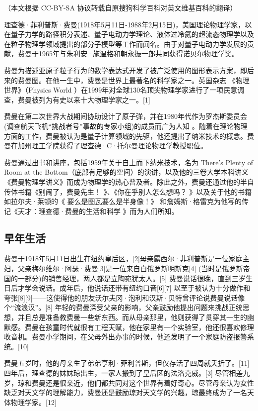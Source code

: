 
（本文根据 CC-BY-SA 协议转载自原搜狗科学百科对英文维基百科的翻译）

理查德·菲利普斯·费曼(1918年5月11日-1988年2月15日)，美国理论物理学家，以在量子力学的路径积分表述、量子电动力学理论、液体过冷氦的超流态物理学以及在粒子物理学领域提出的部分子模型等工作而闻名。由于对量子电动力学发展的贡献，费曼于1965年与朱利安·施温格和朝永振一郎共同获得诺贝尔物理学奖。

费曼为描述亚原子粒子行为的数学表达式开发了被广泛使用的图形表示方案，即后来的费曼图。在他一生中，费曼是世界上最著名的科学家之一。英国杂志 《物理世界》（Physics World ）在1999年对全球130名顶尖物理学家进行了一项民意调查，费曼被列为有史以来十大物理学家之一。[1]

费曼在第二次世界大战期间协助设计了原子弹，并在1980年代作为罗杰斯委员会(调查航天飞机“挑战者号”事故的专家小组)的成员而广为人知 。随着在理论物理方面的工作，费曼被认为是量子计算领域的先驱，他还提出了纳米技术的概念。费曼在加州理工学院获得了理查德·C·托尔曼理论物理学教授职位。

费曼通过出书和讲座，包括1959年关于自上而下纳米技术，名为 There's Plenty of Room at the Bottom（底部有足够的空间）的演讲，以及他的三卷大学本科讲义《费曼物理学讲义》而成为物理学的热心普及者。除此之外，费曼还通过他的半自传体书籍《别闹了，费曼先生！ 》、《你在乎别人怎么想吗？ 》以及关于他的书籍如拉尔夫·莱顿的《 要么是图瓦要么是半身像！》 和詹姆斯·格雷克为他写的传记《天才：理查德·费曼的生活和科学 》而为人们所知。

\subsection{早年生活}
费曼于1918年5月11日出生在纽约皇后区，[2]母亲露西尔·菲利普斯是一位家庭主妇，父亲梅尔维尔·阿瑟·费曼[3]是一位来自白俄罗斯明斯克[4] (当时是俄罗斯帝国的一部分)的销售经理，两人都是立陶宛犹太人。[5] 费曼说话很晚，直到三岁生日后才学会说话。成年后，他说话还带有纽约口音[6][7] 以至于被认为十分做作和夸张[8][9]——这使得他的朋友沃尔夫冈·泡利和汉斯·贝特曾评论说费曼说话像个“流浪汉”。[8] 年轻的费曼深受父亲的影响，父亲鼓励他提出问题来挑战正统思想，并且总是准备教费曼一些新东西。而从母亲那里，他则获得了贯穿其一生的幽默感。费曼在孩童时代就很有工程天赋，他在家里有一个实验室，他还很喜欢修理收音机。费曼小学期间，在父母外出办事的时候，他还发明了一个家庭防盗报警系统。[10]

费曼五岁时，他的母亲生了弟弟亨利·菲利普斯，但仅存活了四周就夭折了。[11] 四年后，理查德的妹妹琼出生，一家人搬到了皇后区的法洛克威。[3] 尽管相差九岁，琼和费曼还是很亲近，他们都共同对这个世界有着好奇心。尽管母亲认为女性缺乏对天文学的理解能力，费曼还是鼓励琼对天文学的兴趣，琼最终成为了一名天体物理学家。[12]

